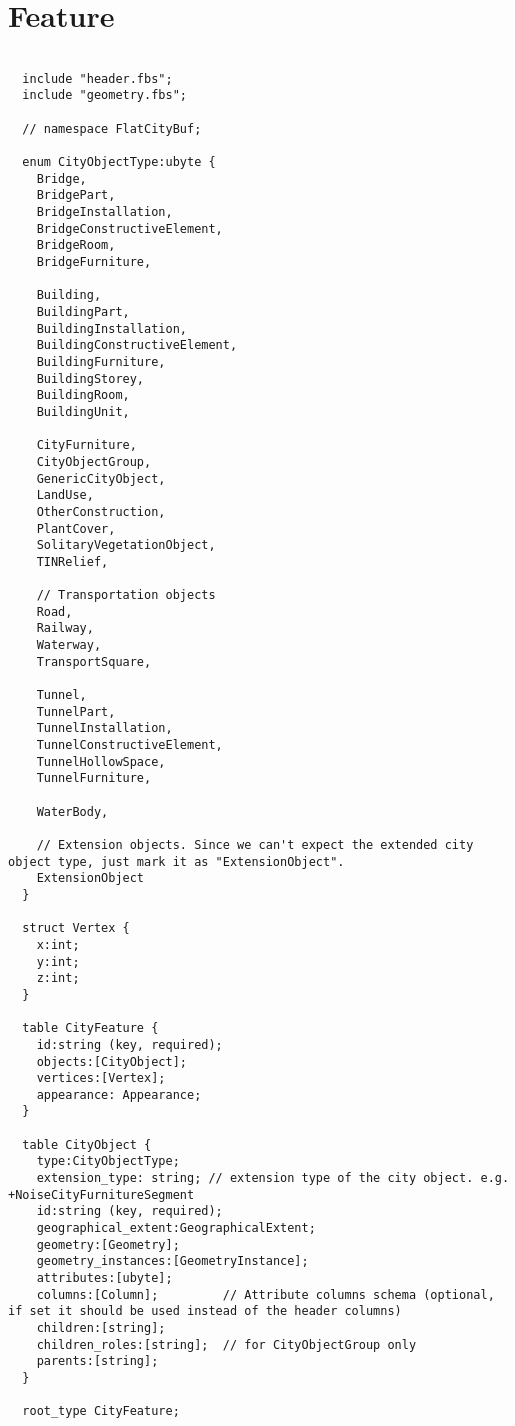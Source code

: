 \section{Feature}
\label{appendix:flatcitybuf_schema:feature}
\begin{lstlisting}[caption={Feature schema of FlatCityBuf}, basicstyle=\small]

  include "header.fbs";
  include "geometry.fbs";

  // namespace FlatCityBuf;

  enum CityObjectType:ubyte {
    Bridge,
    BridgePart,
    BridgeInstallation,
    BridgeConstructiveElement,
    BridgeRoom,
    BridgeFurniture,

    Building,
    BuildingPart,
    BuildingInstallation,
    BuildingConstructiveElement,
    BuildingFurniture,
    BuildingStorey,
    BuildingRoom,
    BuildingUnit,

    CityFurniture,
    CityObjectGroup,
    GenericCityObject,
    LandUse,
    OtherConstruction,
    PlantCover,
    SolitaryVegetationObject,
    TINRelief,

    // Transportation objects
    Road,
    Railway,
    Waterway,
    TransportSquare,

    Tunnel,
    TunnelPart,
    TunnelInstallation,
    TunnelConstructiveElement,
    TunnelHollowSpace,
    TunnelFurniture,

    WaterBody,

    // Extension objects. Since we can't expect the extended city object type, just mark it as "ExtensionObject".
    ExtensionObject
  }

  struct Vertex {
    x:int;
    y:int;
    z:int;
  }

  table CityFeature {
    id:string (key, required);
    objects:[CityObject];
    vertices:[Vertex];
    appearance: Appearance;
  }

  table CityObject {
    type:CityObjectType;
    extension_type: string; // extension type of the city object. e.g. +NoiseCityFurnitureSegment
    id:string (key, required);
    geographical_extent:GeographicalExtent;
    geometry:[Geometry];
    geometry_instances:[GeometryInstance];
    attributes:[ubyte];
    columns:[Column];         // Attribute columns schema (optional, if set it should be used instead of the header columns)
    children:[string];
    children_roles:[string];  // for CityObjectGroup only
    parents:[string];
  }

  root_type CityFeature;
\end{lstlisting}
